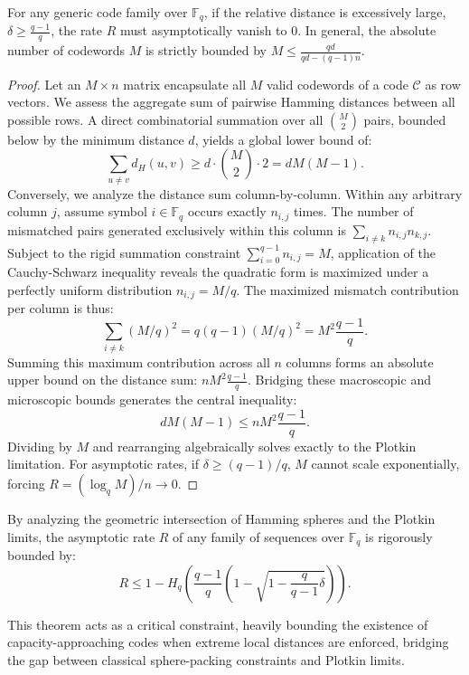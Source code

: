 \begin{theorem}
For any generic code family over $\mathbb{F}_q$, if the relative distance is excessively large, $\delta \ge \frac{q-1}{q}$, the rate $R$ must asymptotically vanish to $0$. In general, the absolute number of codewords $M$ is strictly bounded by $M \le \frac{qd}{qd - (q-1)n}$.
\end{theorem}

\begin{proof}
Let an $M \times n$ matrix encapsulate all $M$ valid codewords of a code $\mathcal{C}$ as row vectors. We assess the aggregate sum of pairwise Hamming distances between all possible rows.
A direct combinatorial summation over all $\binom{M}{2}$ pairs, bounded below by the minimum distance $d$, yields a global lower bound of:
\[
\sum_{u \neq v} d_H(u, v) \ge d \cdot \binom{M}{2} \cdot 2 = d M(M-1).
\]
Conversely, we analyze the distance sum column-by-column. Within any arbitrary column $j$, assume symbol $i \in \mathbb{F}_q$ occurs exactly $n_{i,j}$ times. The number of mismatched pairs generated exclusively within this column is $\sum_{i \neq k} n_{i,j} n_{k,j}$. Subject to the rigid summation constraint $\sum_{i=0}^{q-1} n_{i,j} = M$, application of the Cauchy-Schwarz inequality reveals the quadratic form is maximized under a perfectly uniform distribution $n_{i,j} = M/q$. The maximized mismatch contribution per column is thus:
\[
\sum_{i \neq k} (M/q)^2 = q(q-1)(M/q)^2 = M^2 \frac{q-1}{q}.
\]
Summing this maximum contribution across all $n$ columns forms an absolute upper bound on the distance sum: $n M^2 \frac{q-1}{q}$.
Bridging these macroscopic and microscopic bounds generates the central inequality:
\[
d M(M-1) \le n M^2 \frac{q-1}{q}.
\]
Dividing by $M$ and rearranging algebraically solves exactly to the Plotkin limitation. For asymptotic rates, if $\delta \ge (q-1)/q$, $M$ cannot scale exponentially, forcing $R = (\log_q M)/n \to 0$.
\end{proof}

\begin{theorem}
By analyzing the geometric intersection of Hamming spheres and the Plotkin limits, the asymptotic rate $R$ of any family of sequences over $\mathbb{F}_q$ is rigorously bounded by:
\[
R \le 1 - H_q\left( \frac{q-1}{q} \left(1 - \sqrt{1 - \frac{q}{q-1} \delta} \right) \right).
\]
\end{theorem}

This theorem acts as a critical constraint, heavily bounding the existence of capacity-approaching codes when extreme local distances are enforced, bridging the gap between classical sphere-packing constraints and Plotkin limits.

